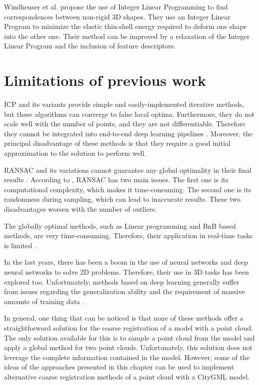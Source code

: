     Windheuser et al. \cite{Windheuser_2011_largescale} propose the use of Integer Linear Programming to find correspondences between non-rigid 3D shapes.
    They use an Integer Linear Program to minimize the elastic thin-shell energy required to deform one shape into the other one.
    Their method can be improved by a relaxation of the Integer Linear Program and the inclusion of feature descriptors.

    \section{Limitations of previous work} 

    ICP and its variants provide simple and easily-implemented iterative methods, but these algorithms can converge to false local optima.
    Furthermore, they do not scale well with the number of points, and they are not differentiable. 
    Therefore they cannot be integrated into end-to-end deep learning pipelines \cite{Sarode_2019_oneframework}. 
    Moreover, the principal disadvantage of these methods is that they require a good initial approximation to the solution to perform well.
    
    RANSAC and its variations cannot guarantee any global optimality in their final results \cite{Bazin_2013_abranchandbound}.
    According to \cite{Quan_2020_com}, RANSAC has two main issues. 
    The first one is its computational complexity, which makes it time-consuming.
    The second one is its randomness during sampling, which can lead to inaccurate results.
    These two disadvantages worsen with the number of outliers.

    The globally optimal methods, such as Linear programming and BnB based methods, are very time-consuming. 
    Therefore, their application in real-time tasks is limited \cite{Sarode_2019_oneframework}.

    In the last years, there has been a boom in the use of neural networks and deep neural networks to solve 2D problems.
    Therefore, their use in 3D tasks has been explored too.
    Unfortunately, methods based on deep learning generally suffer from issues regarding the generalization ability and the requirement of massive amounts of training data \cite{Quan_2020_com}.

    In general, one thing that can be noticed is that none of these methods offer a straightforward solution for the coarse registration of a model with a point cloud.
    The only solution available for this is to sample a point cloud from the model and apply a global method for two point clouds.
    Unfortunately, this solution does not leverage the complete information contained in the model.
    However, some of the ideas of the approaches presented in this chapter can be used to implement alternative coarse registration methods of a point cloud with a CityGML model.


